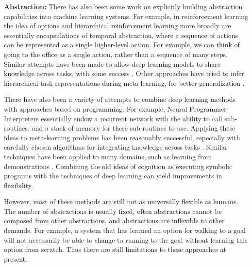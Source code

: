 \textbf{Abstraction:} There has also been some work on explicitly building abstraction capabilities into machine learning systems. For example, in reinforcement learning the idea of options \citep{Sutton1999} and hierarchical reinforcement learning more broadly \citep[e.g.][]{Botvinick2009} are essentially encapsulations of temporal abstraction, where a sequence of actions can be represented as a single higher-level action. For example, we can think of going to the office as a single action, rather than a sequence of many steps. Similar attempts have been made to allow deep learning models to share knowledge across tasks, with some success \citep[e.g.][]{Tessler2016}. Other approaches have tried to infer hierarchical task representations during meta-learning, for better generalization \citep{Yao2019}. \par 
There have also been a variety of attempts to combine deep learning methods with approaches based on programming. For example, Neural Programmer-Interpreters \citep{Reed2015} essentially endow a recurrent network with the ability to call sub-routines, and a stack of memory for these sub-routines to use. Applying these ideas to meta-learning problems has been reasonably successful, especially with carefully chosen algorithms for integrating knowledge across tasks \citep[e.g.]{Devlin2017}. Similar techniques have been applied to many domains, such as learning from demonstrations \citep[e.g.][]{Xu2017a}. Combining the old ideas of cognition as executing symbolic programs \citep{Newell1961} with the techniques of deep learning can yield improvements in flexibility. \par  
However, most of these methods are still not as universally flexible as humans. The number of abstractions is usually fixed, often abstractions cannot be composed from other abstractions, and abstractions are inflexible to other demands. For example, a system that has learned an option for walking to a goal will not necessarily be able to change to running to the goal without learning this option from scratch. Thus there are still limitations to these approaches at present. \par 

